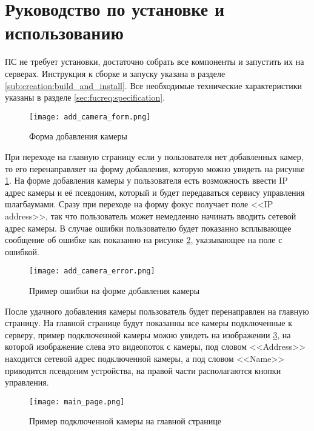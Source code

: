 \section{Руководство по установке и использованию} 
\label{sec:user_guide}

ПС не требует установки, достаточно собрать все компоненты и запустить их на серверах. Инструкция к сборке и запуску указана в разделе \ref{sub:creation:build_and_install}.
Все необходимые технические характеристики указаны в разделе \ref{sec:fucreq:specification}.

\begin{figure}[ht]
  \centering
  \texttt{[image: add\_camera\_form.png]} 
  \caption{Форма добавления камеры} 
  \label{sec:user_guide:add_camera}
\end{figure}

При переходе на главную страницу если у пользователя нет добавленных камер, то его перенаправляет на форму добавления, которую можно увидеть на рисунке \ref{sec:user_guide:add_camera}. На форме добавления камеры у пользователя есть возможность ввести IP адрес камеры и её псевдоним, который и будет передаваться сервису управления шлагбаумами. Сразу при переходе на форму фокус получает поле <<IP address>>, так что пользователь может немедленно начинать вводить сетевой адрес камеры. В случае ошибки пользователю будет показанно всплывающее сообщение об ошибке как показанно на рисунке \ref{sec:user_guide:add_camera_error}, указывающее на поле с ошибкой.

\begin{figure}[ht]
  \centering
  \texttt{[image: add\_camera\_error.png]} 
  \caption{Пример ошибки на форме добавления камеры} 
  \label{sec:user_guide:add_camera_error}
\end{figure}

После удачного добавления камеры пользователь будет перенаправлен на главную страницу. На главной странице будут показанны все камеры подключенные к серверу, пример подключенной камеры можно увидеть на изображении \ref{sec:user_guide:main_page_camera}, на которой изображение слева это видеопоток с камеры, под словом <<Address>> находится сетевой адрес подключенной камеры, а под словом <<Name>> приводится псевдоним устройства, на правой части располагаются кнопки управления. 

\begin{figure}[ht]
  \centering
  \texttt{[image: main\_page.png]} 
  \caption{Пример подключенной камеры на главной странице} 
  \label{sec:user_guide:main_page_camera}
\end{figure}

